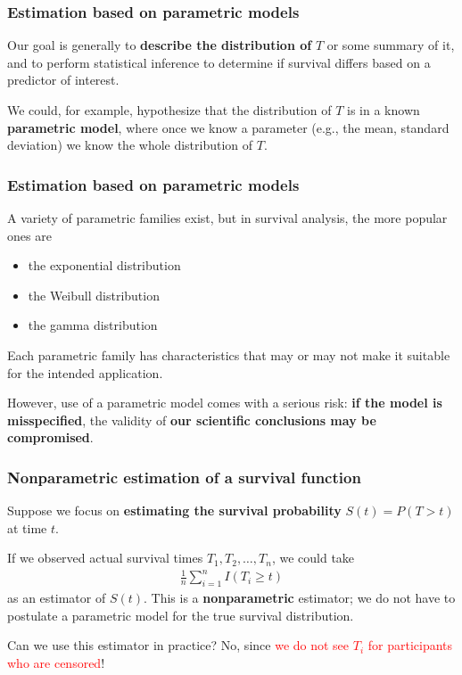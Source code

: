 \documentclass[12pt, 
hyperref={colorlinks=true, linkcolor=blue, urlcolor=cyan},dvipsnames]{beamer}
\begin{document}
\begin{frame}
\frametitle{Estimation based on parametric models}

Our goal is generally to \textbf{describe the distribution of} $T$ or some summary of it, and to perform statistical inference to determine if survival differs based on a predictor of interest.

We could, for example, hypothesize that the distribution of $T$ is in a known \textbf{parametric model}, where once we know a parameter (e.g., the mean, standard deviation) we know the whole distribution of $T$.

\end{frame}

\begin{frame}
\frametitle{Estimation based on parametric models}

A variety of parametric families exist, but in survival analysis, the more popular ones are
\begin{itemize}
\item the exponential distribution
\item the Weibull distribution
\item the gamma distribution
\end{itemize}

Each parametric family has characteristics that may or may not make it suitable for the intended application.

However, use of a parametric model comes with a serious risk: \textbf{if the model is misspecified}, the validity of \textbf{our scientific conclusions may be compromised}.
\end{frame}

\begin{frame}
\frametitle{Nonparametric estimation of a survival function}

Suppose we focus on \textbf{estimating the survival probability} $S(t) = P(T > t)$ at time $t$.

If we observed actual survival times $T_1, T_2, \dots, T_n$, we could take
\begin{align*}
\frac{1}{n}\sum_{i=1}^n I(T_i \geq t)
\end{align*}
as an estimator of $S(t)$. This is a \textbf{nonparametric} estimator; we do not have to postulate a parametric model for the true survival distribution.

Can we use this estimator in practice? \pause No, since \textcolor{red}{we do not see $T_i$ for participants who are censored}!
\end{frame}
\end{document}
